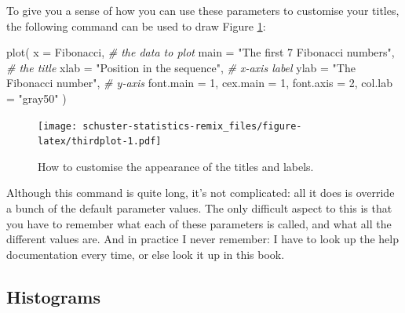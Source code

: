 \documentclass[
]{book}
\newenvironment{Shaded}{\begin{snugshade}}{\end{snugshade}}
\newcommand{\AttributeTok}[1]{\textcolor[rgb]{0.77,0.63,0.00}{#1}}
\newcommand{\CommentTok}[1]{\textcolor[rgb]{0.56,0.35,0.01}{\textit{#1}}}
\newcommand{\DecValTok}[1]{\textcolor[rgb]{0.00,0.00,0.81}{#1}}
\newcommand{\FunctionTok}[1]{\textcolor[rgb]{0.00,0.00,0.00}{#1}}
\newcommand{\NormalTok}[1]{#1}
\newcommand{\StringTok}[1]{\textcolor[rgb]{0.31,0.60,0.02}{#1}}
\begin{document}
To give you a sense of how you can use these parameters to customise your titles, the following command can be used to draw Figure \ref{fig:thirdplot}:

\begin{Shaded}
\begin{Highlighting}[]
\FunctionTok{plot}\NormalTok{( }\AttributeTok{x =}\NormalTok{ Fibonacci,                           }\CommentTok{\# the data to plot}
          \AttributeTok{main =} \StringTok{"The first 7 Fibonacci numbers"}\NormalTok{,  }\CommentTok{\# the title}
          \AttributeTok{xlab =} \StringTok{"Position in the sequence"}\NormalTok{,       }\CommentTok{\# x{-}axis label}
          \AttributeTok{ylab =} \StringTok{"The Fibonacci number"}\NormalTok{,           }\CommentTok{\# y{-}axis }
          \AttributeTok{font.main =} \DecValTok{1}\NormalTok{,}
          \AttributeTok{cex.main =} \DecValTok{1}\NormalTok{,}
          \AttributeTok{font.axis =} \DecValTok{2}\NormalTok{,}
          \AttributeTok{col.lab =} \StringTok{"gray50"}\NormalTok{ )}
\end{Highlighting}
\end{Shaded}

\begin{figure}
\centering
\texttt{[image: schuster-statistics-remix\_files/figure-latex/thirdplot-1.pdf]}
\caption{\label{fig:thirdplot}How to customise the appearance of the titles and labels.}
\end{figure}

Although this command is quite long, it's not complicated: all it does is override a bunch of the default parameter values. The only difficult aspect to this is that you have to remember what each of these parameters is called, and what all the different values are. And in practice I never remember: I have to look up the help documentation every time, or else look it up in this book.

\hypertarget{hist}{%
\subsection{Histograms}\label{hist}}
\end{document}
